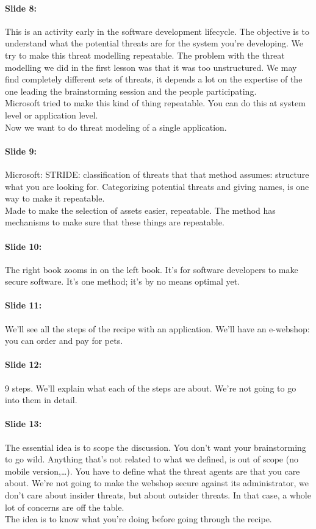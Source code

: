 \documentclass[10pt,a4paper]{report}
\begin{document}
\paragraph{Slide 8:} This is an activity early in the software development lifecycle. The objective is to understand what the potential threats are for the system you're developing. We try to make this threat modelling repeatable. The problem with the threat modelling we did in the first lesson was that it was too unstructured. We may find completely different sets of threats, it depends a lot on the expertise of the one leading the brainstorming session and the people participating.\\
Microsoft tried to make this kind of thing repeatable. You can do this at system level or application level. \\
Now we want to do threat modeling of a single application.

\paragraph{Slide 9:} Microsoft: STRIDE: classification of threats that that method assumes: structure what you are looking for. Categorizing potential threats and giving names, is one way to make it repeatable.\\ 
Made to make the selection of assets easier, repeatable. The method has mechanisms to make sure that these things are repeatable. 

\paragraph{Slide 10:} The right book zooms in on the left book. It's for software developers to make secure software. It's one method; it's by no means optimal yet.

\paragraph{Slide 11:} We'll see all the steps of the recipe with an application. We'll have an e-webshop: you can order and pay for pets.

\paragraph{Slide 12:} 9 steps. We'll explain what each of the steps are about. We're not going to go into them in detail.

\paragraph{Slide 13:} The essential idea is to scope the discussion. You don't want your brainstorming to go wild. Anything that's not related to what we defined, is out of scope (no mobile version,…). You have to define what the threat agents are that you care about. We're not going to make the webshop secure against its administrator, we don't care about insider threats, but about outsider threats. In that case, a whole lot of concerns are off the table. \\
The idea is to know what you're doing before going through the recipe.
\end{document}

